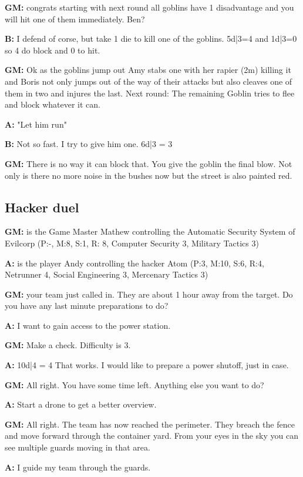 \documentclass[11pt]{article}
\begin{document}
{\begin{multicols}{2}[]
\textbf{GM:} congrats starting with next round all goblins have 1 disadvantage and you will hit one of them immediately. Ben?

\textbf{B:} I defend of corse, but take 1 die to kill one of the goblins. 5d|3=4 and 1d|3=0 so 4 do block and 0 to hit.

\textbf{GM:} Ok as the goblins jump out Amy stabs one with her rapier (2m) killing it and Boris not only jumps out of the way of their attacks but also cleaves one of them in two and injures the last. Next round: The remaining Goblin tries to flee and block whatever it can.

\textbf{A:} "Let him run"

\textbf{B:} Not so fast. I try to give him one. 6d|3 = 3

\textbf{GM:} There is no way it can block that. You give the goblin the final blow. Not only is there no more noise in the bushes now but the street is also painted red.

\subsection{Hacker duel}
\label{sec:orgeab047f}

\textbf{GM:} is the Game Master Mathew controlling the Automatic Security System of Evilcorp (P:-, M:8, S:1, R: 8, Computer Security 3, Military Tactics 3)

\textbf{A:} is the player Andy controlling the hacker Atom (P:3, M:10, S:6, R:4, Netrunner 4, Social Engineering 3, Mercenary Tactics 3)

\textbf{GM:} your team just called in. They are about 1 hour away from the target. Do you have any last minute preparations to do?

\textbf{A:} I want to gain access to the power station.

\textbf{GM:} Make a check. Difficulty is 3.

\textbf{A:} 10d|4 = 4 That works. I would like to prepare a power shutoff, just in case.

\textbf{GM:} All right. You have some time left. Anything else you want to do?

\textbf{A:} Start a drone to get a better overview.

\textbf{GM:} All right. The team has now reached the perimeter. They breach the fence and move forward through the container yard. From your eyes in the sky you can see multiple guards moving in that area.

\textbf{A:} I guide my team through the guards.


\end{multicols}}
\end{document}
